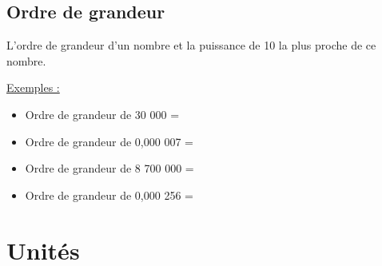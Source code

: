 \subsection{Ordre de grandeur}
\begin{tcolorbox}
[colback=green!5!white,colframe=green!75!black,title=\textbf{Ordre de grandeur d'un nombre}]
L'ordre de grandeur d'un nombre et la puissance de 10 la plus proche de ce nombre.
\end{tcolorbox}
\underline{Exemples :}
\begin{itemize}
    \item Ordre de grandeur de 30 000 = 
    \item Ordre de grandeur de 0,000 007 = 
    \item Ordre de grandeur de 8 700 000 = 
    \item Ordre de grandeur de 0,000 256 = 
\end{itemize}

\section{Unités}

